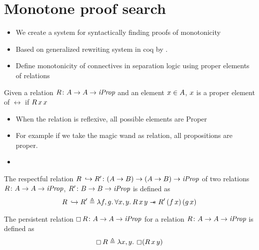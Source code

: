 \documentclass[thesis.tex]{subfiles}
\begin{document}
\section{Monotone proof search}
\begin{itemize}
    \item We create a system for syntactically finding proofs of monotonicity
    \item Based on generalized rewriting system in coq by  \cite*{sozeauNewLookGeneralized2009}.
    \item {} Define monotonicity of connectives in separation logic using proper elements of relations
\end{itemize}

\begin{definition}
    Given a relation $R\colon A\to A\to\textit{iProp}$ and an element $x\in A$, $x$ is a proper element of $\rel$ if $R\, x\, x$
\end{definition}
\begin{itemize}
    \item When the relation is reflexive, all possible elements are Proper
    \item For example if we take the magic wand as relation, all propositions are proper.
    \item
\end{itemize}
\begin{definition}
    The respectful relation $R \nobreak\hskip 0.2em plus 0.1em\hookrightarrow R'\colon(A\to B) \to (A\to B) \to \textit{iProp}$ of two relations $R\colon A\to A\to\textit{iProp}$, $R'\colon B\to B\to\textit{iProp}$ is defined as
    \begin{align*}
        \rel \respect \rel' \eqdef \Lam \func, \funcB. \All \var,\varB. \rel\, \var\, \varB \wand \rel'\, (\func\, \var)\, (\funcB\, \var)
    \end{align*}
\end{definition}

\begin{definition}
    The persistent relation $\mathop{\boxempty}R\colon A\to A\to\textit{iProp}$ for a relation $R\colon A\to A\to\textit{iProp}$ is defined as
    \[\always\rel \eqdef \Lam\var,\varB. \always (\rel\,\var\,\varB)\]
\end{definition}
\end{document}

